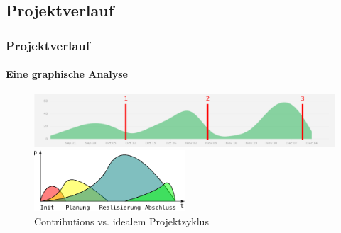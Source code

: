 
\subsection{Projektverlauf}
\begin{frame}
	\frametitle{Projektverlauf\hfill{}\footnotesize \group}
	\framesubtitle{Eine graphische Analyse}
	\begin{figure}
		\centering
		\includegraphics[width=1\textwidth]{../../fig/pm/gh-contributions-ov_marked.pdf}

		\includegraphics[width=0.5\textwidth]{../../fig/pm/pm-phasen.pdf}
		\caption{Contributions vs. idealem Projektzyklus}
	\end{figure}
\end{frame}

